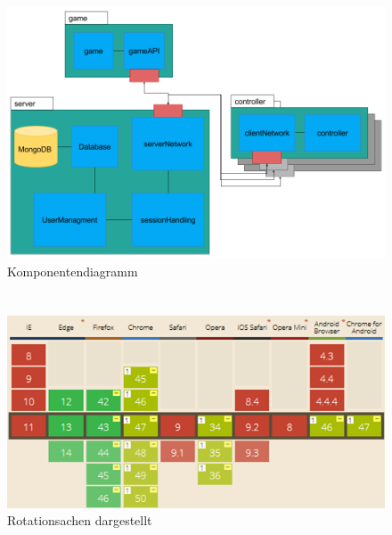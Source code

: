 \documentclass[a4paper]{spie}  %
\begin{document}
\begin{appendices}
\section{}
\begin{figure}[H]
	\centering
	\includegraphics[width=1\textwidth]{images/komponenten}
	\caption{Komponentendiagramm}
	\label{komponenten}
\end{figure}
  \section{}

	\begin{figure}[H]
		\includegraphics{images/caniuseGetUserMedia}
		\caption{Rotationsachen dargestellt}
		\label{app:caniuseMedia}
	\end{figure}



\end{appendices}
\end{document}
